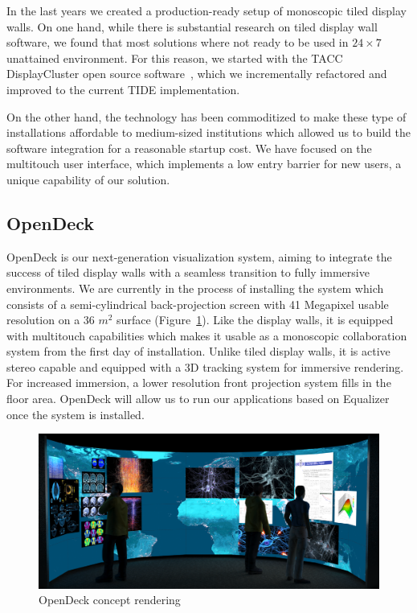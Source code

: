 \documentclass[10pt]{llncs}
\newcommand{\fig}[1]{Figure~\ref{#1}}
\begin{document}
In the last years we created a production-ready setup of monoscopic tiled
display walls. On one hand, while there is substantial research on tiled display
wall software, we found that most solutions where not ready to be used in
$24\times 7$ unattained environment. For this reason, we started with the TACC
DisplayCluster open source software~\cite{DisplayCluster}, which we
incrementally refactored and improved to the current TIDE implementation.

On the other hand, the technology has been commoditized to make these type of
installations affordable to medium-sized institutions which allowed us to build
the software integration for a reasonable startup cost. We have focused on the
multitouch user interface, which implements a low entry barrier for new users,
a unique capability of our solution.

\subsection{OpenDeck}

OpenDeck is our next-generation visualization system, aiming to integrate the
success of tiled display walls with a seamless transition to fully immersive
environments. We are currently in the process of installing the system which
consists of a semi-cylindrical back-projection screen with 41 Megapixel usable
resolution on a 36 $m^2$ surface (\fig{fOpenDeck}). Like the display walls, it
is equipped with multitouch capabilities which makes it usable as a monoscopic
collaboration system from the first day of installation. Unlike tiled display
walls, it is active stereo capable and equipped with a 3D tracking system for
immersive rendering. For increased immersion, a lower resolution front
projection system fills in the floor area. OpenDeck will allow us to run our
applications based on Equalizer~\cite{EMP:09} once the system is installed.

\begin{figure}[h!t]
  \includegraphics[width=\columnwidth]{images/opendeck}
  \caption{\label{fOpenDeck}OpenDeck concept rendering}
\end{figure}
\end{document}
